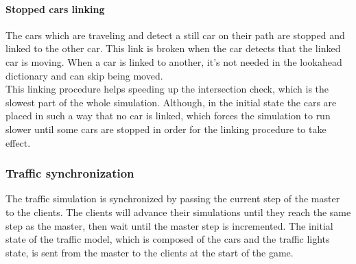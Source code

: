 \documentclass[12pt]{article}
\begin{document}
\paragraph{Stopped cars linking}
The cars which are traveling and detect a still car on their path are stopped and linked to the other car. This link is broken when the car detects that the linked car is moving. When a car is linked to another, it's not needed in the lookahead dictionary and can skip being moved. \\
This linking procedure helps speeding up the intersection check, which is the slowest part of the whole simulation. Although, in the initial state the cars are placed in such a way that no car is linked, which forces the simulation to run slower until some cars are stopped in order for the linking procedure to take effect.

\subsubsection{Traffic synchronization}
The traffic simulation is synchronized by passing the current step of the master to the clients. The clients will advance their simulations until they reach the same step as the master, then wait until the master step is incremented. The initial state of the traffic model, which is composed of the cars and the traffic lights state, is sent from the master to the clients at the start of the game.

\clearpage
\end{document}
